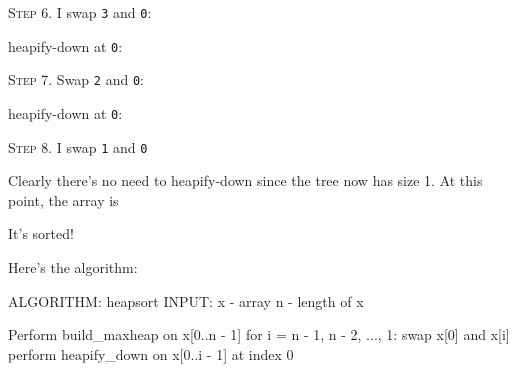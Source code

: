 \textsc{Step 6}.
I swap \texttt{3} and \texttt{0}:



heapify-down at \texttt{0}:





\textsc{Step 7}.
Swap \texttt{2} and \texttt{0}:



heapify-down at \texttt{0}:





\textsc{Step 8}.
I swap \texttt{1} and \texttt{0}



Clearly there's no need to heapify-down since the tree now has size 1.
At this point, the array is

It's sorted!

Here's the algorithm:
\begin{console}
ALGORITHM: heapsort
INPUT:     x - array
           n - length of x

Perform build_maxheap on x[0..n - 1]
for i = n - 1, n - 2, ..., 1: 
    swap x[0] and x[i]
    perform heapify_down on x[0..i - 1] at index 0
\end{console}








